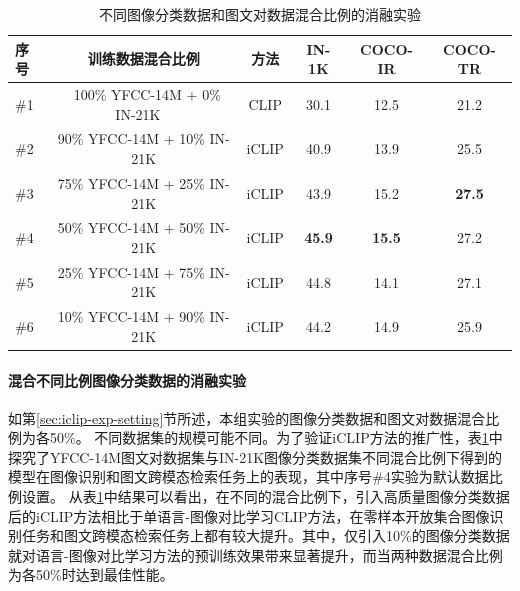 \begin{table}
    \centering
    \caption{不同图像分类数据和图文对数据混合比例的消融实验}
    \begin{tabular}{lccccc}
    \toprule
        序号 & 训练数据混合比例 & 方法 & IN-1K & COCO-IR & COCO-TR    \\
        \midrule
        \#1 & ~100\% YFCC-14M + 0\% IN-21K ~& CLIP & 30.1 & 12.5 & 21.2  \\

        \#2 & {90\% YFCC-14M + 10\% IN-21K} & iCLIP & 40.9 & 13.9 & 25.5 \\ 

        \#3 & {75\% YFCC-14M + 25\% IN-21K} & iCLIP & 43.9 & 15.2 & \textbf{27.5} \\ 
        
        \#4 & 50\% YFCC-14M + 50\% IN-21K & iCLIP & \textbf{45.9} & \textbf{15.5} & 27.2 \\    
        
        \#5 & {25\% YFCC-14M + 75\% IN-21K} & iCLIP & 44.8 & 14.1 & 27.1 \\  

        \#6 & {10\% YFCC-14M + 90\% IN-21K} & iCLIP & 44.2 & 14.9 & 25.9 \\
        \bottomrule
    \end{tabular}
    \label{tab:iclip-ablate_combine}
\end{table}

\paragraph{混合不同比例图像分类数据的消融实验} 如第\ref{sec:iclip-exp-setting}节所述，本组实验的图像分类数据和图文对数据混合比例为各50\%。
不同数据集的规模可能不同。为了验证iCLIP方法的推广性，表\ref{tab:iclip-ablate_combine}中探究了YFCC-14M图文对数据集与IN-21K图像分类数据集不同混合比例下得到的模型在图像识别和图文跨模态检索任务上的表现，其中序号\#4实验为默认数据比例设置。
从表\ref{tab:iclip-ablate_combine}中结果可以看出，在不同的混合比例下，引入高质量图像分类数据后的iCLIP方法相比于单语言-图像对比学习CLIP方法，在零样本开放集合图像识别任务和图文跨模态检索任务上都有较大提升。其中，仅引入10\%的图像分类数据就对语言-图像对比学习方法的预训练效果带来显著提升，而当两种数据混合比例为各50\%时达到最佳性能。

